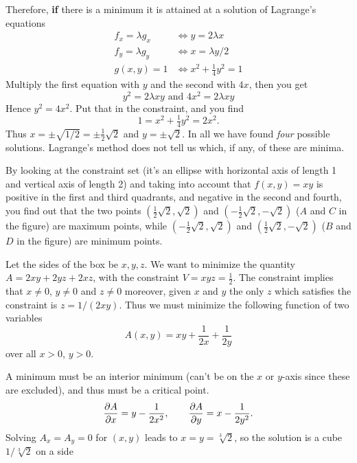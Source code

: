 Therefore, \textbf{if} there is a minimum it is attained at a solution
of Lagrange's equations
\begin{align*}
  f_x = \lambda g_x &\iff y = 2\lambda x \\
  f_y = \lambda g_y &\iff x = \lambda y/2 \\
  g(x, y) = 1 & \iff x^2+\tfrac14 y^2 = 1
\end{align*}
Multiply the first equation with $y$ and the second with $4x$, then
you get
\[
y^2 = 2\lambda xy \text{ and } 4x^2 = 2\lambda xy
\]
Hence $y^2 = 4x^2$.  Put that in the constraint, and you find
\[
1=x^2 + \tfrac14 y^2 = 2 x^2.
\]
Thus $x= \pm\sqrt{1/2} = \pm \frac12 \sqrt{2}$ and $y = \pm \sqrt2$.
In all we have found \emph{four} possible solutions.
Lagrange's method does not tell us which, if any, of these are minima.

By looking at the constraint set (it's an ellipse with horizontal axis
of length 1 and vertical axis of length 2) and taking into account
that $f(x, y) =xy$ is positive in the first and third quadrants, and
negative in the second and fourth, you find out that the two points
$(\frac12\sqrt{2},\sqrt{2})$ and $(-\frac12\sqrt{2},-\sqrt{2})$  ($A$
and $C$ in the figure) are maximum points, while
$(-\frac12\sqrt{2},\sqrt{2})$ and $(\frac12\sqrt{2},-\sqrt{2})$  ($B$
and $D$ in the figure) are minimum points.
\bigskip

\item[{\bfseries(V13.2a)}]

Let the sides of the box be $x,y,z$.  We want to minimize the quantity $A =
2xy+2yz+2xz$, with the constraint $V=xyz=\frac12$.  The constraint implies that
$x\neq0$, $y\neq0$ and $z\neq0$ moreover, given $x$ and $y$ the only $z$
which satisfies the constraint is $z=1/(2xy)$.  Thus we must minimize the
following function of two variables
\[
A(x,y) = xy + \frac{1} {2x} + \frac{1} {2y}
\]
over all $x>0$, $y>0$.

A minimum must be an interior minimum (can't be on the $x$ or $y$-axis
since these are excluded), and thus must be a critical point.
\[
\frac{\partial A}{\partial x} = y-\frac{1} {2x^2}, \qquad
\frac{\partial A}{\partial y} = x - \frac{1} {2y^2}.
\]
Solving $A_x=A_y=0$ for $(x,y)$ leads to $x=y=\sqrt[3]2$, so the solution
is a cube $1/\sqrt[3]{2}$ on a side
\bigskip

\item[{\bfseries(V13.2b)}]

